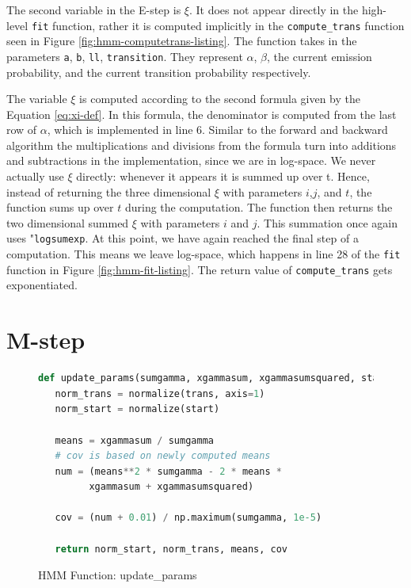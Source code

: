 The second variable in the E-step is $\xi$. It does not appear directly in the high-level \texttt{fit} function, rather it is computed implicitly in the \texttt{compute\_trans} function seen in Figure \ref{fig:hmm-computetrans-listing}. The function takes in the parameters \texttt{a}, \texttt{b}, \texttt{ll}, \texttt{transition}. They represent $\alpha$, $\beta$, the current emission probability, and the current transition probability respectively. 

The variable $\xi$ is computed according to the second formula given by the Equation \eqref{eq:xi-def}. In this formula, the denominator is computed from the last row of $\alpha$, which is implemented in line 6. Similar to the forward and backward algorithm the multiplications and divisions from the formula turn into additions and subtractions in the implementation, since we are in log-space. 
We never actually use $\xi$ directly: whenever it appears it is summed up over t. Hence, instead of returning the three dimensional $\xi$ with parameters $i$,$j$, and $t$, the function sums up over $t$ during the computation. The function then returns the two dimensional summed $\xi$ with parameters $i$ and $j$. This summation once again uses "\texttt{logsumexp}. At this point, we have again reached the final step of a computation. This means we leave log-space, which happens in line 28 of the \texttt{fit} function in Figure \ref{fig:hmm-fit-listing}. The return value of \texttt{compute\_trans} gets exponentiated. 

\section{M-step}

\begin{figure}
\begin{singlespace}
\begin{lstlisting}[language=Python]
def update_params(sumgamma, xgammasum, xgammasumsquared, start, trans):
   norm_trans = normalize(trans, axis=1)
   norm_start = normalize(start)

   means = xgammasum / sumgamma
   # cov is based on newly computed means
   num = (means**2 * sumgamma - 2 * means *
         xgammasum + xgammasumsquared)

   cov = (num + 0.01) / np.maximum(sumgamma, 1e-5)

   return norm_start, norm_trans, means, cov
\end{lstlisting}
\end{singlespace}
\caption{HMM Function: update\_params}    
\label{fig:hmm-updateparams-listing}
\end{figure}

